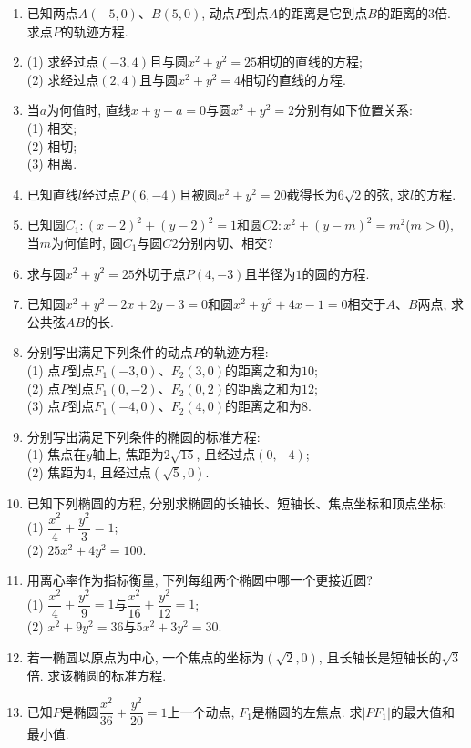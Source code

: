 \documentclass[10pt,a4paper]{article}
\begin{document}
\begin{enumerate}[1.]
\item 已知两点$A(-5,0)$、$B(5,0)$, 动点$P$到点$A$的距离是它到点$B$的距离的$3$倍. 求点$P$的轨迹方程. 
\item (1) 求经过点$(-3,4)$且与圆$x^2+y^2=25$相切的直线的方程;\\
(2) 求经过点$(2,4)$且与圆$x^2+y^2=4$相切的直线的方程.
\item 当$a$为何值时, 直线$x+y-a=0$与圆$x^2+y^2=2$分别有如下位置关系:\\
(1) 相交;\\
(2) 相切;\\ 
(3) 相离.
\item 已知直线$l$经过点$P(6,-4)$且被圆$x^2+y^2=20$截得长为$6\sqrt 2$的弦, 求$l$的方程. 
\item 已知圆$C_1:(x-2)^2+(y-2)^2=1$和圆$C2:x^2+(y-m)^2=m^2$($m>0$), 当$m$为何值时, 圆$C_1$与圆$C2$分别内切、相交?
\item 求与圆$x^2+y^2=25$外切于点$P(4,-3)$且半径为$1$的圆的方程.
\item 已知圆$x^2+y^2-2x+2y-3=0$和圆$x^2+y^2+4x-1=0$相交于$A$、$B$两点, 求公共弦$AB$的长.
\item 分别写出满足下列条件的动点$P$的轨迹方程:\\
(1) 点$P$到点$F_1(-3,0)$、$F_2(3,0)$的距离之和为$10$;\\
(2) 点$P$到点$F_1(0,-2)$、$F_2(0,2)$的距离之和为$12$;\\
(3) 点$P$到点$F_1(-4,0)$、$F_2(4,0)$的距离之和为$8$.
\item 分别写出满足下列条件的椭圆的标准方程:\\
(1) 焦点在$y$轴上, 焦距为$2\sqrt {15}$, 且经过点$(0,-4)$;\\
(2) 焦距为$4$, 且经过点$(\sqrt 5,0)$.
\item 已知下列椭圆的方程, 分别求椭圆的长轴长、短轴长、焦点坐标和顶点坐标:\\
(1) $\dfrac{x^2}4+\dfrac{y^2}3=1$;\\
(2) $25x^2+4y^2=100$.
\item 用离心率作为指标衡量, 下列每组两个椭圆中哪一个更接近圆?\\
(1) $\dfrac{x^2}4+\dfrac{y^2}9=1$与$\dfrac{x^2}{16}+\dfrac{y^2}{12}=1$;\\
(2) $x^2+9y^2=36$与$5x^2+3y^2=30$.
\item 若一椭圆以原点为中心, 一个焦点的坐标为$(\sqrt 2,0)$, 且长轴长是短轴长的$\sqrt 3$倍. 求该椭圆的标准方程. 
\item 已知$P$是椭圆$\dfrac{x^2}{36}+\dfrac{y^2}{20}=1$上一个动点, $F_1$是椭圆的左焦点. 求$|PF_1|$的最大值和最小值.

\end{enumerate}
\end{document}
